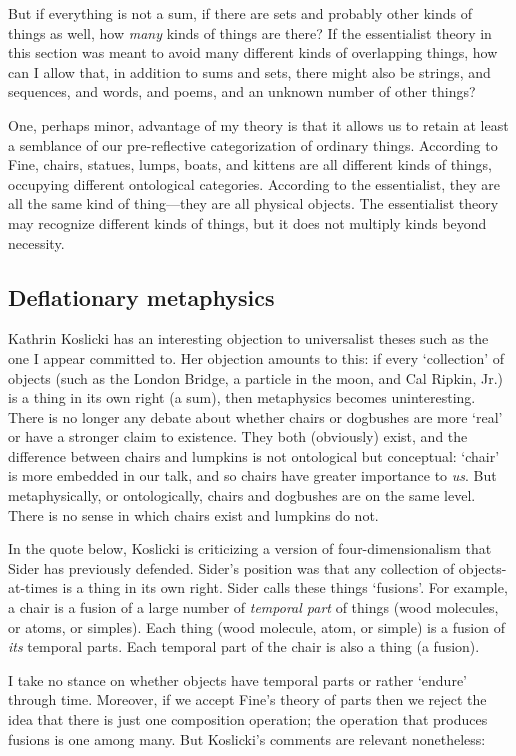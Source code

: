 \documentclass[11pt]{article}
\begin{document}
\begin{spacing}{1.5}
But if everything is not a sum, if there are sets and probably other
kinds of things as well, how {\em many} kinds of things are there?  If
the essentialist theory in this section was meant to avoid many
different kinds of overlapping things, how can I allow that, in
addition to sums and sets, there might also be strings, and sequences,
and words, and poems, and an unknown number of other things?

One, perhaps minor, advantage of my theory is that it allows us to
retain at least a semblance of our pre-reflective categorization of
ordinary things.  According to Fine, chairs, statues, lumps, boats,
and kittens are all different kinds of things, occupying different
ontological categories.  According to the essentialist, they are all
the same kind of thing---they are all physical objects.  The
essentialist theory may recognize different kinds of things, but it
does not multiply kinds beyond necessity.

\subsection{Deflationary metaphysics}
\label{deflate}
Kathrin Koslicki has an interesting objection to universalist theses
such as the one I appear committed to.  Her objection amounts to this:
if every `collection' of objects (such as the London Bridge, a
particle in the moon, and Cal Ripkin, Jr.) is a thing in its own right
(a sum), then metaphysics becomes uninteresting.  There is no longer
any debate about whether chairs or dogbushes are more `real' or have a
stronger claim to existence.  They both (obviously) exist, and the
difference between chairs and lumpkins is not ontological but
conceptual: `chair' is more embedded in our talk, and so chairs have
greater importance to {\em us}.  But metaphysically, or ontologically,
chairs and dogbushes are on the same level.  There is no sense in
which chairs exist and lumpkins do not.

In the quote below, Koslicki is criticizing a version of
four-dimensionalism that Sider has previously defended.  Sider's
position was that any collection of objects-at-times is a thing in its
own right.  Sider calls these things `fusions'.  For example, a chair
is a fusion of a large number of {\em temporal part} of things (wood
molecules, or atoms, or simples).  Each thing (wood molecule, atom, or
simple) is a fusion of {\em its} temporal parts.  Each temporal part
of the chair is also a thing (a fusion).

I take no stance on whether objects have temporal parts or rather
`endure' through time.  Moreover, if we accept Fine's theory of parts
then we reject the idea that there is just one composition operation;
the operation that produces fusions is one among many.  But Koslicki's
comments are relevant nonetheless:


\end{spacing}
\end{document}
